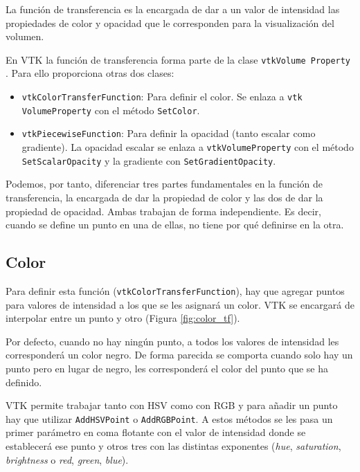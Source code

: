 La función de transferencia es la encargada de dar a un valor de intensidad las propiedades de color y opacidad que le corresponden para la visualización del volumen.

En VTK la función de transferencia forma parte de la clase \texttt{vtkVolume Property} \cite{vtk_example_medical4}. Para ello proporciona otras dos clases:
\begin{itemize}
	\item \texttt{vtkColorTransferFunction}: Para definir el color. Se enlaza a \texttt{vtk VolumeProperty} con el método \texttt{SetColor}.
	\item \texttt{vtkPiecewiseFunction}: Para definir la opacidad (tanto escalar como gradiente). La opacidad escalar se enlaza a \texttt{vtkVolumeProperty} con el método \texttt{SetScalarOpacity} y la gradiente con \texttt{SetGradientOpacity}.
\end{itemize}

Podemos, por tanto, diferenciar tres partes fundamentales en la función de transferencia, la encargada de dar la propiedad de color y las dos de dar la propiedad de opacidad. Ambas trabajan de forma independiente. Es decir, cuando se define un punto en una de ellas, no tiene por qué definirse en la otra.

\subsection{Color}

Para definir esta función (\texttt{vtkColorTransferFunction}), hay que agregar puntos para valores de intensidad a los que se les asignará un color. VTK se encargará de interpolar entre un punto y otro (Figura \ref{fig:color_tf}). 

Por defecto, cuando no hay ningún punto, a todos los valores de intensidad les corresponderá un color negro. De forma parecida se comporta cuando solo hay un punto pero en lugar de negro, les corresponderá el color del punto que se ha definido.

VTK permite trabajar tanto con HSV como con RGB y para añadir un punto hay que utilizar \texttt{AddHSVPoint} o \texttt{AddRGBPoint}. A estos métodos se les pasa un primer parámetro en coma flotante con el valor de intensidad donde se establecerá ese punto y otros tres con las distintas exponentes (\textit{hue}, \textit{saturation}, \textit{brightness} o \textit{red}, \textit{green}, \textit{blue}).


